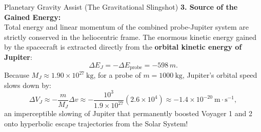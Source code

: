 \begin{workedexample}{Planetary Gravity Assist (The Gravitational Slingshot)}
\textbf{3. Source of the Gained Energy:}\\
Total energy and linear momentum of the combined probe-Jupiter system are strictly conserved in the heliocentric frame. The enormous kinetic energy gained by the spacecraft is extracted directly from the \textbf{orbital kinetic energy of Jupiter}:
\[
\Delta E_J = -\Delta E_{\text{probe}} = -598\,m.
\]
Because $M_J \approx 1.90\times 10^{27}\ \mathrm{kg}$, for a probe of $m = 1000\ \mathrm{kg}$, Jupiter's orbital speed slows down by:
\[
\Delta V_J \approx -\frac{m}{M_J} \Delta v \approx -\frac{10^3}{1.9\times 10^{27}}(2.6\times 10^4) \approx -1.4\times 10^{-20}\ \mathrm{m\cdot s^{-1}},
\]
an imperceptible slowing of Jupiter that permanently boosted Voyager 1 and 2 onto hyperbolic escape trajectories from the Solar System!
\end{workedexample}

